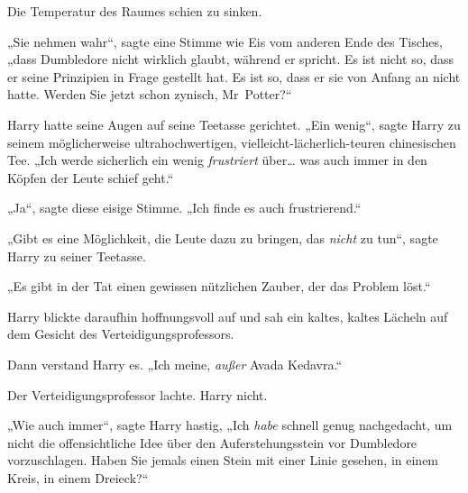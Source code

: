 Die Temperatur des Raumes schien zu sinken.

„Sie nehmen wahr“, sagte eine Stimme wie Eis vom anderen Ende des Tisches, „dass Dumbledore nicht wirklich glaubt, während er spricht. Es ist nicht so, dass er seine Prinzipien in Frage gestellt hat. Es ist so, dass er sie von Anfang an nicht hatte. Werden Sie jetzt schon zynisch, Mr~Potter?“

Harry hatte seine Augen auf seine Teetasse gerichtet. „Ein wenig“, sagte Harry zu seinem möglicherweise ultrahochwertigen, vielleicht-lächerlich-teuren chinesischen Tee. „Ich werde sicherlich ein wenig \emph{frustriert} über… was auch immer in den Köpfen der Leute schief geht.“

„Ja“, sagte diese eisige Stimme. „Ich finde es auch frustrierend.“

„Gibt es eine Möglichkeit, die Leute dazu zu bringen, das \emph{nicht} zu tun“, sagte Harry zu seiner Teetasse.

„Es gibt in der Tat einen gewissen nützlichen Zauber, der das Problem löst.“

Harry blickte daraufhin hoffnungsvoll auf und sah ein kaltes, kaltes Lächeln auf dem Gesicht des Verteidigungsprofessors.

Dann verstand Harry es. „Ich meine, \emph{außer} Avada Kedavra.“

Der Verteidigungsprofessor lachte. Harry nicht.

„Wie auch immer“, sagte Harry hastig, „Ich \emph{habe} schnell genug nachgedacht, um nicht die offensichtliche Idee über den Auferstehungsstein vor Dumbledore vorzuschlagen. Haben Sie jemals einen Stein mit einer Linie gesehen, in einem Kreis, in einem Dreieck?“

